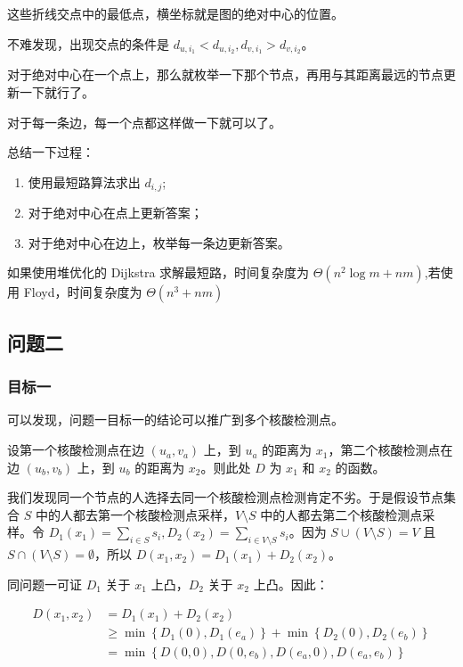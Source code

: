 \documentclass{cumcmthesis}
\begin{document}
这些折线交点中的最低点，横坐标就是图的绝对中心的位置。

不难发现，出现交点的条件是 $d_{u,i_1} < d_{u,i_2},d_{v,i_1} > d_{v,i_2}$。

对于绝对中心在一个点上，那么就枚举一下那个节点，再用与其距离最远的节点更新一下就行了。

对于每一条边，每一个点都这样做一下就可以了。

总结一下过程：

\begin{enumerate}
    \item 使用最短路算法求出 $d_{i,j}$;
    \item 对于绝对中心在点上更新答案；
    \item 对于绝对中心在边上，枚举每一条边更新答案。
\end{enumerate}

如果使用堆优化的 Dijkstra 求解最短路，时间复杂度为 $\Theta(n^2\log m + nm)$,若使用 Floyd，时间复杂度为 $\Theta(n^3 + nm)$

\subsection{问题二}

\subsubsection{目标一}

可以发现，问题一目标一的结论可以推广到多个核酸检测点。

设第一个核酸检测点在边 $(u_a,v_a)$ 上，到 $u_a$ 的距离为 $x_1$，第二个核酸检测点在边 $(u_b,v_b)$ 上，到 $u_b$ 的距离为 $x_2$。则此处 $D$ 为 $x_1$ 和 $x_2$ 的函数。

我们发现同一个节点的人选择去同一个核酸检测点检测肯定不劣。于是假设节点集合 $S$ 中的人都去第一个核酸检测点采样，$V\setminus S$ 中的人都去第二个核酸检测点采样。令 $D_1(x_1)=\sum_{i\in S}s_i,D_2(x_2)=\sum_{i\in V\setminus S}s_i$。因为 $S\cup (V\setminus S)=V$ 且 $S\cap (V\setminus S)=\emptyset$，所以 $D(x_1,x_2)=D_1(x_1)+D_2(x_2)$。

同问题一可证 $D_1$ 关于 $x_1$ 上凸，$D_2$ 关于 $x_2$ 上凸。因此：

\begin{align*}
    D(x_1,x_2)&=D_1(x_1)+D_2(x_2)\\
    &\ge \min\left\{D_1(0),D_1(e_a)\right\}+\min\left\{D_2(0),D_2(e_b)\right\}\\
    &=\min\left\{D(0,0),D(0,e_b),D(e_a,0),D(e_a,e_b)\right\}
\end{align*}\par
\end{document}
